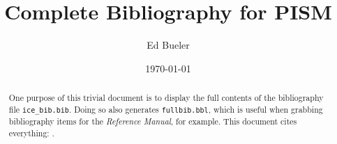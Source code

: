 \documentclass[10pt,final]{amsart}
\title{Complete Bibliography for PISM}
\author{Ed Bueler}
\date{\today}
\begin{document}
\begin{abstract}
One purpose of this trivial document is to display the full contents of the 
bibliography file \texttt{ice\_bib.bib}.  Doing so also generates \texttt{fullbib.bbl}, 
which is useful when grabbing bibliography items for the \emph{Reference Manual}, 
for example.  This document cites everything: \cite{*}.
\end{abstract}

\maketitle

\bigskip



\end{document}
